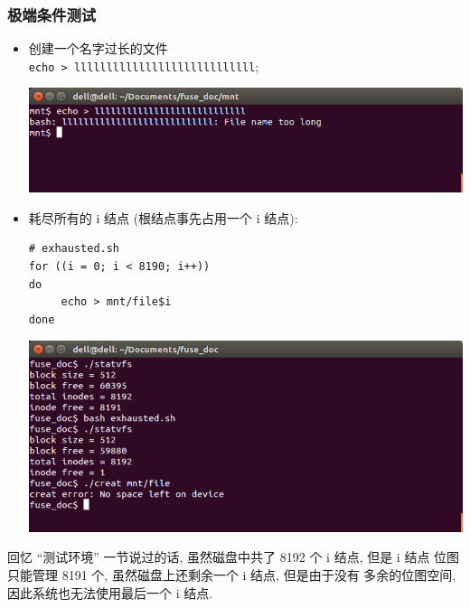 \documentclass[nofonts, titlepage]{ctexart}
\begin{document}
\subsubsection{极端条件测试}
\begin{itemize}
\item
  创建一个名字过长的文件 \\
  \texttt{echo > llllllllllllllllllllllllllll};

  \includegraphics[width=14cm]{./images/./name_too_long.png}
\item
  耗尽所有的 i 结点 (根结点事先占用一个 i 结点):

\begin{verbatim}
# exhausted.sh
for ((i = 0; i < 8190; i++))
do
     echo > mnt/file$i
done  
\end{verbatim}

  \includegraphics[width=14cm]{./images/./exhausted_1.png}
\end{itemize}

回忆 ``测试环境'' 一节说过的话, 虽然磁盘中共了 8192 个 i 结点, 但是 i
结点 位图只能管理 8191 个, 虽然磁盘上还剩余一个 i 结点, 但是由于没有
多余的位图空间, 因此系统也无法使用最后一个 i 结点.
\end{document}
